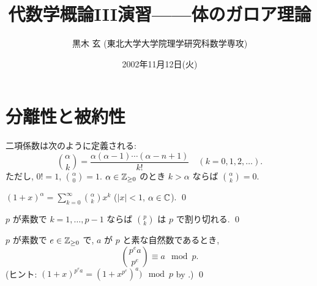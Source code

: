 \documentclass[12pt,twoside]{jarticle}
\begin{document}

\title{\bf 代数学概論III演習——体のガロア理論}

\author{黒木 玄 \quad (東北大学大学院理学研究科数学専攻)}

\date{2002年11月12日(火)}

\maketitle

\setcounter{page}{36}      %
\setcounter{section}{2}    %
\setcounter{theorem}{7}    %
\setcounter{question}{128} %
\setcounter{footnote}{30}  %

\tableofcontents


\section{分離性と被約性}

二項係数は次のように定義される:
\begin{equation*}
  \binom{\alpha}{k} 
  = \frac{\alpha(\alpha-1)\cdots(\alpha-n+1)}{k!}
  \quad (k=0,1,2,\ldots).
\end{equation*}
ただし,  $0!=1$, $\binom{\alpha}{0}=1$. 
$\alpha\in{\mathbb Z}_{\ge0}$ のとき $k>\alpha$ ならば $\binom{\alpha}{k}=0$.

\begin{question}[一般化された二項定理]
  \quad $\displaystyle
  (1 + x)^\alpha = \sum_{k=0}^\infty \binom{\alpha}{k} x^k$ 
  \quad ($|x|<1$, $\alpha\in{\mathbb C}$). \qed
\end{question}

\begin{question}\label{q:binom-1}
  $p$ が素数で $k=1,\ldots,p-1$ ならば $\binom{p}{k}$ は $p$ で割り切れる.
  \qed
\end{question}

\begin{question}\label{q:binom-2}
  $p$ が素数で $e\in{\mathbb Z}_{\ge0}$ で, $a$ が $p$ と素な自然数であるとき,
  \begin{equation*}
    \binom{p^e a}{p^e} \equiv a \mod p.
  \end{equation*}
  (ヒント: $(1 + x)^{p^e a}=(1 + x^{p^e})^a) \mod p$ by .) 
  \qed
\end{question}
\end{document}
